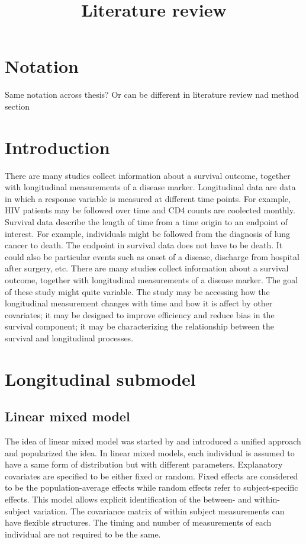 \documentclass{article}
\title{Literature review}
\numberwithin{equation}{section}
\begin{document}
\maketitle

\tableofcontents

\newpage

\section{Notation}
Same notation across thesis? Or can be different in literature review nad method section

\section{Introduction}\label{section1}
There are many studies collect information about a survival outcome, together with longitudinal measurements of a disease marker. Longitudinal data are data in which a response variable is measured at different time points. For example, HIV patients may be followed over time and CD4 counts are coolected monthly.  Survival data describe the length of time from a time origin to an endpoint of interest. For example, individuals might be followed from the diagnosis of lung cancer to death. The endpoint in survival data does not have to be death. It could also be particular events such as onset of a disease, discharge from hospital after surgery, etc. There are many studies collect information about a survival outcome, together with longitudinal measurements of a disease marker. The goal of these study might quite variable. The study may be accessing how the longitudinal measurement changes with time and how it is affect by other covariates;  it may be designed to improve efficiency and reduce bias in the survival component; it may be characterizing the relationship between the survival and longitudinal processes.

\section{Longitudinal submodel}
\subsection{Linear mixed model}
The idea of linear mixed model was started by \cite{harville1977maximum} and \cite{laird1982random} introduced a unified approach and popularized the idea. In linear mixed models, each individual is assumed to have a same form of distribution but with different parameters. Explanatory covariates are specified to be either fixed or random. Fixed effects are considered to be the population-average effects while random effects refer to subject-specific effects. This model allows explicit identification of the between- and within-subject variation. The covariance matrix of within subject measurements can have flexible structures. The timing and number of measurements of each individual are not required to be the same.  
\end{document}
